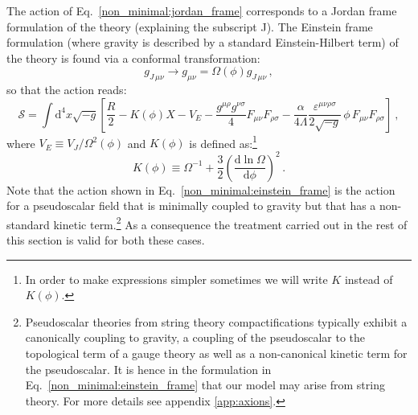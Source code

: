 The action of Eq.~\eqref{non_minimal:jordan_frame} corresponds to a Jordan frame formulation of the theory (explaining the subscript J). The Einstein frame formulation (where gravity is described by a standard Einstein-Hilbert term) of the theory is found via a conformal transformation:
\begin{equation}
	g_{J\, \mu\nu} \rightarrow g_{\mu\nu} = \Omega(\phi) g_{J\, \mu\nu} \, ,
\end{equation}
so that the action reads:
\begin{equation}
	\label{non_minimal:einstein_frame}
	\mathcal{S} = \int \textrm{d}^4 x \sqrt{-g} \left[ \frac{R}{2} - K(\phi)X -V_E -\frac{g^{\mu\rho}g^{\nu\sigma}}{4} F_{\mu\nu}F_{\rho\sigma} -\frac{\alpha}{4 \Lambda} \frac{\varepsilon^{\mu\nu\rho\sigma}}{2 \sqrt{-g}} \, \phi \, F_{\mu\nu}F_{\rho\sigma} \right] \ ,
\end{equation}
where $V_E \equiv V_J/\Omega^2(\phi)$ and $K(\phi)$ is defined as:\footnote{In order to make expressions simpler sometimes we will write $K$ instead of $K(\phi)$.}
\begin{equation}
 	K(\phi) \equiv \Omega^{-1} +  \frac{3}{2} \left( \frac{\textrm{d} \ln \Omega }{\textrm{d} \phi} \right)^2 \, .
 \end{equation} 
Note that the action shown in Eq.~\eqref{non_minimal:einstein_frame} is the action for a pseudoscalar field that is minimally coupled to gravity but that has a non-standard kinetic term.\footnote{Pseudoscalar theories from string theory compactifications typically exhibit a canonically coupling to gravity, a coupling of the pseudoscalar to the topological term of a gauge theory as well as a non-canonical kinetic term for the pseudoscalar. It is hence in the formulation in Eq.~\eqref{non_minimal:einstein_frame} that our model may arise from string theory. For more details see appendix \ref{app:axions}.} As a consequence the treatment carried out in the rest of this section is valid for both these cases.


